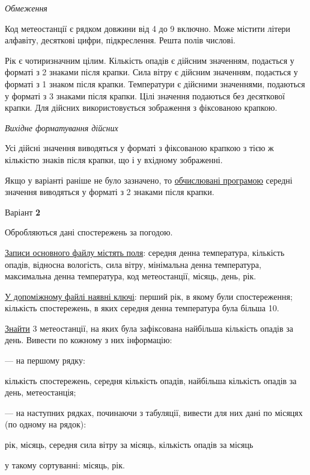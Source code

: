 \documentclass[11pt, ukrainian]{article}
\begin{document}
\bigskip\textit{Обмеження}

Код метеостанції є рядком довжини від 4 до 9 включно.
Може містити літери алфавіту, десяткові цифри, підкреслення. Решта полів числові.

Рік є чотиризначним цілим.
Кількість опадів є дійсним значенням, подається у форматі з 2 знаками після крапки.
Сила вітру є дійсним значенням, подається у форматі з 1 знаком після крапки.
Температури є дійсними значеннями, подаються у форматі з 3 знаками після крапки.
Цілі значення подаються без десяткової крапки.
Для дійсних використовується зображення з фіксованою крапкою.

\textit{Вихідне форматування дійсних}

Усі дійсні значення виводяться у форматі з фіксованою крапкою з тією ж кількістю знаків після крапки, що і у вхідному зображенні.

Якщо у варіанті раніше не було зазначено, то \underline{обчислювані програмою} середні значення виводяться у форматі з 2 знаками після крапки.




\par
\newpage
{\center Варіант  \No \textbf { 2 }\par}
\bigskip
Обробляються дані спостережень за погодою. 

\underline{Записи основного файлу містять поля}: середня денна температура, кількість опадів, відносна вологість, сила вітру, мінімальна денна температура, максимальна денна температура, код метеостанції, місяць, день, рік.

\underline{У допоміжному файлі наявні ключі}: перший рік, в якому були спостереження; кількість спостережень, в яких середня денна температура була більша 10.

\underline{Знайти} 3 метеостанції, на яких була зафіксована найбільша кількість опадів за день. Вивести по кожному з них інформацію:\par
{\noindent}--- на першому рядку:\par
кількість спостережень, середня кількість опадів, найбільша кількість опадів за день, метеостанція;

{\noindent}--- на наступних рядках, починаючи з табуляції, вивести для них дані по місяцях (по одному на рядок):\par
рік, місяць, середня сила вітру за місяць, кількість опадів за місяць

{\noindent}у такому сортуванні: місяць, рік.
\end{document}
